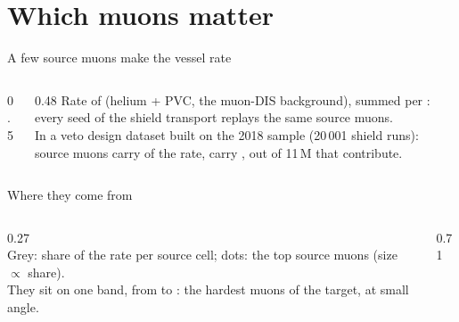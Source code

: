 \documentclass[aspectratio=169,10pt]{beamer}
\newcommand{\sld}[2][\linewidth]{\livewidget{#2}{#1}{0.62cm}}
\begin{document}
\section{Which muons matter}

\begin{frame}{A few source muons make the vessel rate}
  \begin{columns}[c]
    \begin{column}{0.5\textwidth}
    \end{column}
    \begin{column}{0.48\textwidth}\footnotesize
      Rate of  (helium + PVC, the muon-DIS background), summed per : every seed of the shield transport replays the same source muons.\\[1.5mm]
      In a veto design dataset built on the 2018 sample (20\,001 shield runs):  source muons carry  of the rate,  carry , out of 11\,M that contribute.\\[1.5mm]
    \end{column}
  \end{columns}
\end{frame}

\begin{frame}{Where they come from}
  \begin{columns}[T]
    \begin{column}{0.27\textwidth}
      \sld{tm_n}\\[2mm]
      \footnotesize
      Grey: share of the rate per source cell; dots: the top source muons (size $\propto$ share).\\[1mm]
      They sit on one band, from  to : the hardest muons of the target, at small angle.
    \end{column}
    \begin{column}{0.71\textwidth}
    \end{column}
  \end{columns}
\end{frame}
\end{document}
